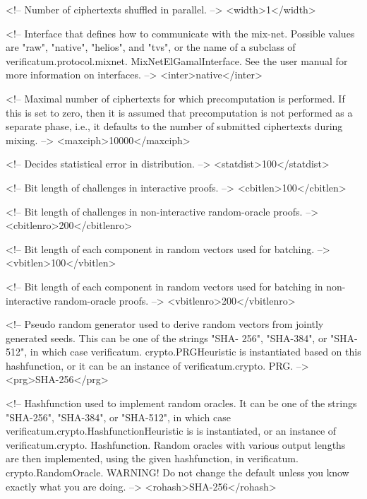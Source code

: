    <!-- Number of ciphertexts shuffled in parallel. -->
   <width>1</width>

   <!-- Interface that defines how to communicate with the mix-net. 
        Possible values are "raw", "native", "helios", and "tvs", or 
        the name of a subclass of verificatum.protocol.mixnet.
        MixNetElGamalInterface. See the user manual for more 
        information on interfaces. -->
   <inter>native</inter>

   <!-- Maximal number of ciphertexts for which precomputation is 
        performed. If this is set to zero, then it is assumed that 
        precomputation is not performed as a separate phase, i.e., it 
        defaults to the number of submitted ciphertexts during mixing. 
        -->
   <maxciph>10000</maxciph>

   <!-- Decides statistical error in distribution. -->
   <statdist>100</statdist>

   <!-- Bit length of challenges in interactive proofs. -->
   <cbitlen>100</cbitlen>

   <!-- Bit length of challenges in non-interactive random-oracle 
        proofs. -->
   <cbitlenro>200</cbitlenro>

   <!-- Bit length of each component in random vectors used for 
        batching. -->
   <vbitlen>100</vbitlen>

   <!-- Bit length of each component in random vectors used for 
        batching in non-interactive random-oracle proofs. -->
   <vbitlenro>200</vbitlenro>

   <!-- Pseudo random generator used to derive random vectors from 
        jointly generated seeds. This can be one of the strings "SHA-
        256", "SHA-384", or "SHA-512", in which case verificatum.
        crypto.PRGHeuristic is instantiated based on this 
        hashfunction, or it can be an instance of verificatum.crypto.
        PRG. -->
   <prg>SHA-256</prg>

   <!-- Hashfunction used to implement random oracles. It can be one 
        of the strings "SHA-256", "SHA-384", or "SHA-512", in which 
        case verificatum.crypto.HashfunctionHeuristic is is 
        instantiated, or an instance of verificatum.crypto.
        Hashfunction. Random oracles with various output lengths are 
        then implemented, using the given hashfunction, in verificatum.
        crypto.RandomOracle.
        WARNING! Do not change the default unless you know exactly 
        what you are doing. -->
   <rohash>SHA-256</rohash>

